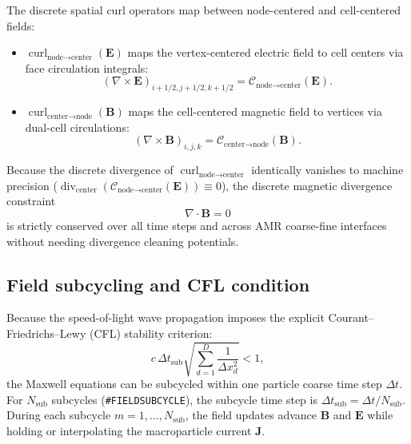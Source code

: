 \documentclass[a4paper, 11pt]{article}
\begin{document}
The discrete spatial curl operators map between node-centered and cell-centered fields:
\begin{itemize}
  \item $\operatorname{curl}_{\text{node}\to\text{center}}(\mathbf{E})$ maps the vertex-centered electric field to cell centers via face circulation integrals:
  \begin{equation}
  (\nabla \times \mathbf{E})_{i+1/2, j+1/2, k+1/2} = \mathcal{C}_{\text{node}\to\text{center}}(\mathbf{E}).
  \end{equation}
  \item $\operatorname{curl}_{\text{center}\to\text{node}}(\mathbf{B})$ maps the cell-centered magnetic field to vertices via dual-cell circulations:
  \begin{equation}
  (\nabla \times \mathbf{B})_{i, j, k} = \mathcal{C}_{\text{center}\to\text{node}}(\mathbf{B}).
  \end{equation}
\end{itemize}
Because the discrete divergence of $\operatorname{curl}_{\text{node}\to\text{center}}$ identically vanishes to machine precision ($\operatorname{div}_{\text{center}}(\mathcal{C}_{\text{node}\to\text{center}}(\mathbf{E})) \equiv 0$), the discrete magnetic divergence constraint
\begin{equation}
\nabla \cdot \mathbf{B} = 0
\end{equation}
is strictly conserved over all time steps and across AMR coarse-fine interfaces without needing divergence cleaning potentials.

\subsection{Field subcycling and CFL condition}

Because the speed-of-light wave propagation imposes the explicit Courant--Friedrichs--Lewy (CFL) stability criterion:
\begin{equation}
c\,\Delta t_{\text{sub}} \sqrt{\sum_{d=1}^D \frac{1}{\Delta x_d^2}} < 1,
\end{equation}
the Maxwell equations can be subcycled within one particle coarse time step $\Delta t$. For $N_{\text{sub}}$ subcycles (\texttt{\#FIELDSUBCYCLE}), the subcycle time step is $\Delta t_{\text{sub}} = \Delta t / N_{\text{sub}}$. During each subcycle $m = 1, \dots, N_{\text{sub}}$, the field updates advance $\mathbf{B}$ and $\mathbf{E}$ while holding or interpolating the macroparticle current $\mathbf{J}$.
\end{document}
